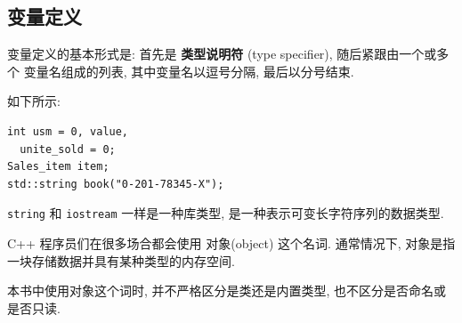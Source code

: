 \documentclass[lang=cn]{elegantbook}
\begin{document}
\subsection{变量定义}
\label{sec:org6fff092}

变量定义的基本形式是: 首先是 \textbf{类型说明符} (type specifier), 随后紧跟由一个或多个
变量名组成的列表, 其中变量名以逗号分隔, 最后以分号结束.

如下所示:

\begin{verbatim}
int usm = 0, value,
  unite_sold = 0;
Sales_item item;
std::string book("0-201-78345-X");
\end{verbatim}

\texttt{string} 和 \texttt{iostream} 一样是一种库类型, 是一种表示可变长字符序列的数据类型.

\begin{definition}[何为对象]
C++ 程序员们在很多场合都会使用 对象(object) 这个名词. 通常情况下, 对象是指一块存储数据并具有某种类型的内存空间.

本书中使用对象这个词时, 并不严格区分是类还是内置类型, 也不区分是否命名或是否只读.
\end{definition}
\end{document}
